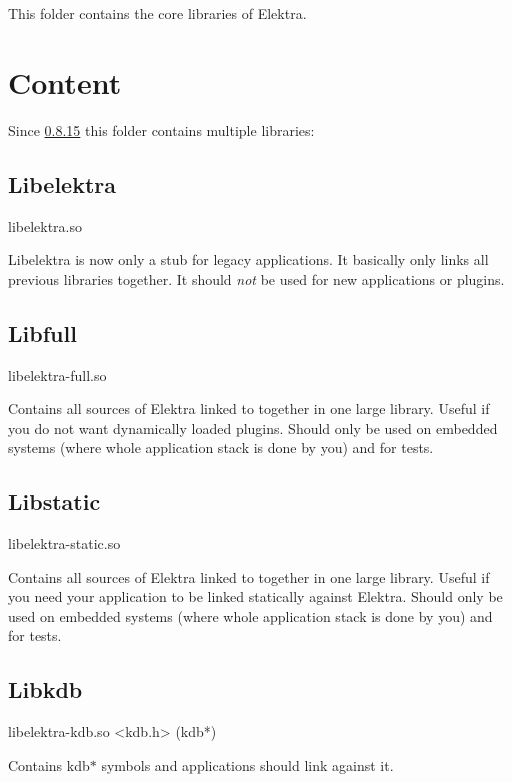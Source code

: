 This folder contains the core libraries of Elektra.\hypertarget{md_src_libs_elektra_README_src_libs_elektra_README_md}{}\section{Content}\label{md_src_libs_elektra_README_src_libs_elektra_README_md}
Since \hyperlink{doc_decisions_library_split_md}{0.8.15} this folder contains multiple libraries\+:

 \hypertarget{md_src_libs_elektra_README_autotoc_md1}{}\subsection{Libelektra}\label{md_src_libs_elektra_README_autotoc_md1}

\begin{DoxyCode}
libelektra.so
\end{DoxyCode}


Libelektra is now only a stub for legacy applications. It basically only links all previous libraries together. It should {\itshape not} be used for new applications or plugins.\hypertarget{md_src_libs_elektra_README_autotoc_md2}{}\subsection{Libfull}\label{md_src_libs_elektra_README_autotoc_md2}

\begin{DoxyCode}
libelektra-full.so
\end{DoxyCode}


Contains all sources of Elektra linked to together in one large library. Useful if you do not want dynamically loaded plugins. Should only be used on embedded systems (where whole application stack is done by you) and for tests.\hypertarget{md_src_libs_elektra_README_autotoc_md3}{}\subsection{Libstatic}\label{md_src_libs_elektra_README_autotoc_md3}

\begin{DoxyCode}
libelektra-static.so
\end{DoxyCode}


Contains all sources of Elektra linked to together in one large library. Useful if you need your application to be linked statically against Elektra. Should only be used on embedded systems (where whole application stack is done by you) and for tests.\hypertarget{md_src_libs_elektra_README_autotoc_md4}{}\subsection{Libkdb}\label{md_src_libs_elektra_README_autotoc_md4}

\begin{DoxyCode}
libelektra-kdb.so
<kdb.h> (kdb*)
\end{DoxyCode}


Contains {\ttfamily kdb$\ast$} symbols and applications should link against it. 